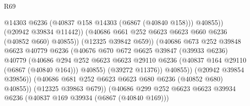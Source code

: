 \begin{lexlean}{R69}
\begin{coremodule}
{                                                @14303
                                                @6236
                                                (@40837 @158 @14303 (@6867 (@40840 @158)))
                                                @40855))
                                            (@20942 @39834 @11442))
                                          (@40686
                                            @661
                                            @252
                                            @6623
                                            @6623
                                            @660
                                            @6236
                                            (@40852 @660)
                                            @40855))
                                        (@12325 @39842 @659))
                                      (@40686
                                        @673
                                        @252
                                        @39848
                                        @6623
                                        @40779
                                        @6236
                                        (@40676
                                          @670
                                          @672
                                          @6625
                                          @39847
                                          (@39933 @6236)
                                          @40779
                                          (@40686
                                            @294
                                            @252
                                            @6623
                                            @6623
                                            @29110
                                            @6236
                                            (@40837 @164 @29110 (@6867 (@40840 @164)))
                                            @40855)
                                          (@39272 @11376))
                                        @40855))
                                    (@20942 @39854 @39856))
                                  (@40686 @681 @252 @6623 @6623 @680 @6236 (@40852 @680) @40855))
                                (@12325 @39863 @679))
                              (@40686
                                @299
                                @252
                                @6623
                                @6623
                                @39934
                                @6236
                                (@40837 @169 @39934 (@6867 (@40840 @169)))
}
\end{coremodule}
\end{lexlean}
